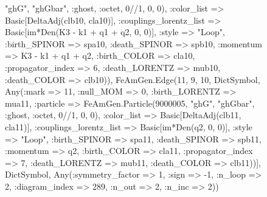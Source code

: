 \documentclass{revtex4}
\begin{document}
\begin{figure}[!htb]
\begin{center}
{"ghG", "ghGbar", :ghost, :octet, 0//1, 0, 0), :color_list => Basic[DeltaAdj(clb10, cla10)], :couplings_lorentz_list => Basic[im*Den(K3 - k1 + q1 + q2, 0, 0)], :style => "Loop", :birth_SPINOR => spa10, :death_SPINOR => spb10, :momentum => K3 - k1 + q1 + q2, :birth_COLOR => cla10, :propagator_index => 6, :death_LORENTZ => mub10, :death_COLOR => clb10)), FeAmGen.Edge(11, 9, 10, Dict{Symbol, Any}(:mark => 11, :null_MOM => 0, :birth_LORENTZ => mua11, :particle => FeAmGen.Particle(9000005, "ghG", "ghGbar", :ghost, :octet, 0//1, 0, 0), :color_list => Basic[DeltaAdj(clb11, cla11)], :couplings_lorentz_list => Basic[im*Den(q2, 0, 0)], :style => "Loop", :birth_SPINOR => spa11, :death_SPINOR => spb11, :momentum => q2, :birth_COLOR => cla11, :propagator_index => 7, :death_LORENTZ => mub11, :death_COLOR => clb11))], Dict{Symbol, Any}(:symmetry_factor => 1, :sign => -1, :n_loop => 2, :diagram_index => 289, :n_out => 2, :n_inc => 2)) 
}
\end{center}
\end{figure}
\end{document}

